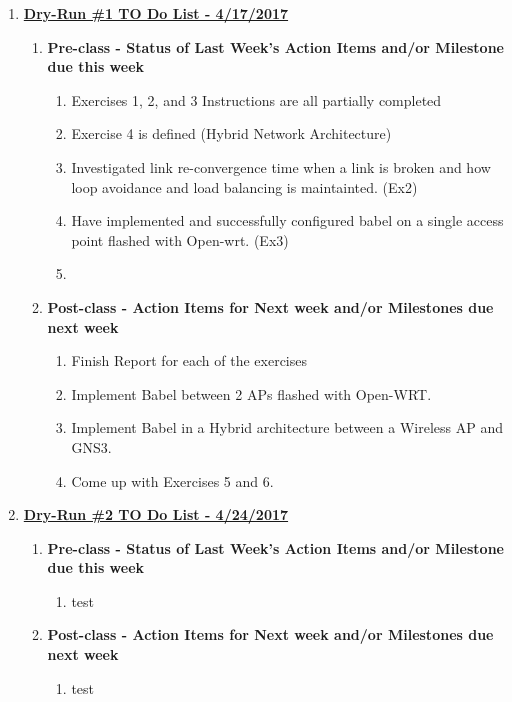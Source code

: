 \documentclass[main.tex]{subfiles}
\begin{document}
\begin{enumerate}[leftmargin=12mm,labelsep=0.1cm]
     \item[] \textbf{\Large \underline{Dry-Run \#1 TO Do List - 4/17/2017}}
    \begin{enumerate}
         \item \textbf{Pre-class - Status of Last Week's Action Items and/or Milestone due this week}
         \begin{enumerate}
            \item Exercises 1, 2, and 3 Instructions are all partially completed
            \item Exercise 4 is defined (Hybrid Network Architecture)
            \item Investigated link re-convergence time when a link is broken and how loop avoidance and load balancing is maintainted. (Ex2)
            \item Have implemented and successfully configured babel on a single access point flashed with Open-wrt. (Ex3)
            \item 
         \end{enumerate}
         \item \textbf{Post-class - Action Items for Next week and/or Milestones due next week}
         \begin{enumerate}
            \item Finish Report for each of the exercises
            \item Implement Babel between 2 APs flashed with Open-WRT.
            \item Implement Babel in a Hybrid architecture between a Wireless AP and GNS3.
            \item Come up with Exercises 5 and 6.
         \end{enumerate}
    \end{enumerate}
     
     \item[] \textbf{\Large \underline{Dry-Run \#2 TO Do List - 4/24/2017}}
    \begin{enumerate}
         \item \textbf{Pre-class - Status of Last Week's Action Items and/or Milestone due this week}
         \begin{enumerate}
            \item test
         \end{enumerate}
         \item \textbf{Post-class - Action Items for Next week and/or Milestones due next week}
         \begin{enumerate}
            \item test
         \end{enumerate}
    \end{enumerate}
    
\end{enumerate}
\end{document}

